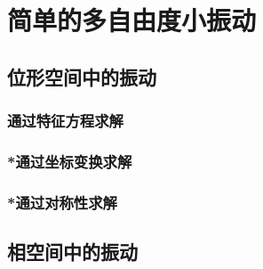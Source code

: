 

\section{简单的多自由度小振动}\label{5-3}

\subsection{位形空间中的振动}\label{5-3-1}

\subsubsection{通过特征方程求解}\label{5-3-1-1}

\subsubsection{*通过坐标变换求解}\label{5-3-1-2}

\subsubsection{*通过对称性求解}\label{5-3-1-2}

\subsection{相空间中的振动}\label{5-3-2}

